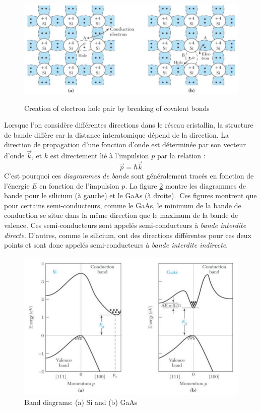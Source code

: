 \begin{figure}[h!]
\centering
\includegraphics[width=12cm]{figures/ch01/breakingbond.jpg}
\label{fig:breakingbond}
\caption{Creation of electron hole pair by breaking of covalent bonds}
\end{figure} 

Lorsque l'on considère différentes directions dans le réseau cristallin, la structure de bande diffère car la distance interatomique dépend de la direction. La direction de propagation d'une fonction d'onde est déterminée par son vecteur d'onde $\vec{k}$, et $k$ est directement lié à l'impulsion $p$ par la relation :
$$\vec{p} = \hbar \vec{k}$$
C'est pourquoi ces \emph{diagrammes de bande} sont généralement tracés en fonction de l'énergie $E$ en fonction de l'impulsion $p$. La figure \ref{fig:indirectbandgap} montre les diagrammes de bande pour le silicium (à gauche) et le GaAs (à droite).\
Ces figures montrent que pour certains semi-conducteurs, comme le GaAs, le minimum de la bande de conduction se situe dans la même direction que le maximum de la bande de valence. Ces semi-conducteurs sont appelés semi-conducteurs à \emph{bande interdite directe}. D'autres, comme le silicium, ont des directions différentes pour ces deux points et sont donc appelés semi-conducteurs à \emph{bande interdite indirecte}.

\begin{figure}[h!]
\centering
\includegraphics[width=12cm]{figures/ch01/indirectbandgap.jpg}
\caption{Band diagrams: (a) Si and (b) GaAs} 
\label{fig:indirectbandgap}
\end{figure} 

